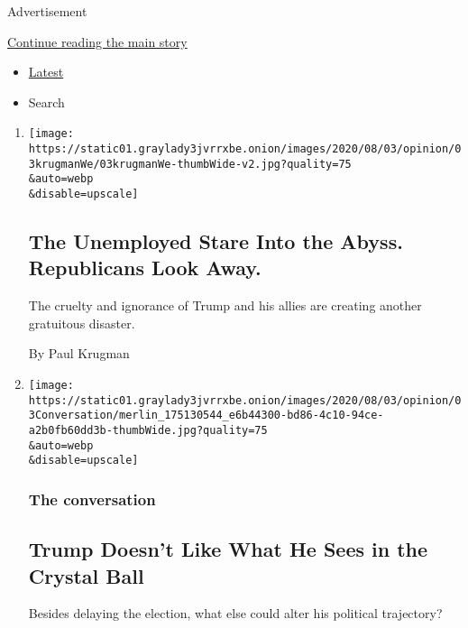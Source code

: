 Advertisement

\protect\hyperlink{after-mid1}{Continue reading the main story}

\begin{itemize}
\tightlist
\item
  \protect\hyperlink{stream-panel}{Latest}
\item
  Search
\end{itemize}

\begin{enumerate}
\def\labelenumi{\arabic{enumi}.}
\item
  \href{/2020/08/03/opinion/republicans-unemployed-coronavirus.html}{}

  \texttt{[image: https://static01.graylady3jvrrxbe.onion/images/2020/08/03/opinion/03krugmanWe/03krugmanWe-thumbWide-v2.jpg?quality=75\\\&auto=webp\\\&disable=upscale]}

  \hypertarget{the-unemployed-stare-into-the-abyss-republicans-look-away}{%
  \subsection{The Unemployed Stare Into the Abyss. Republicans Look
  Away.}\label{the-unemployed-stare-into-the-abyss-republicans-look-away}}

  The cruelty and ignorance of Trump and his allies are creating another
  gratuitous disaster.

  By Paul Krugman
\item
  \href{/2020/08/03/opinion/trump-biden-2020.html}{}

  \texttt{[image: https://static01.graylady3jvrrxbe.onion/images/2020/08/03/opinion/03Conversation/merlin\_175130544\_e6b44300-bd86-4c10-94ce-a2b0fb60dd3b-thumbWide.jpg?quality=75\\\&auto=webp\\\&disable=upscale]}

  \hypertarget{the-conversation}{%
  \subsubsection{The conversation}\label{the-conversation}}

  \hypertarget{trump-doesnt-like-what-he-sees-in-the-crystal-ball}{%
  \subsection{Trump Doesn't Like What He Sees in the Crystal
  Ball}\label{trump-doesnt-like-what-he-sees-in-the-crystal-ball}}

  Besides delaying the election, what else could alter his political
  trajectory?


\end{enumerate}
